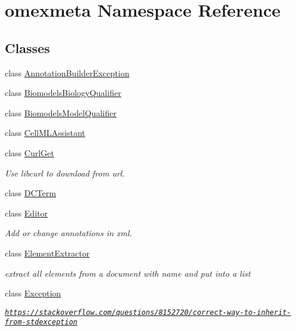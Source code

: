 \hypertarget{namespaceomexmeta}{}\section{omexmeta Namespace Reference}
\label{namespaceomexmeta}
\subsection*{Classes}
\begin{DoxyCompactItemize}
\item 
class \hyperlink{classomexmeta_1_1AnnotationBuilderException}{Annotation\+Builder\+Exception}
\item 
class \hyperlink{classomexmeta_1_1BiomodelsBiologyQualifier}{Biomodels\+Biology\+Qualifier}
\item 
class \hyperlink{classomexmeta_1_1BiomodelsModelQualifier}{Biomodels\+Model\+Qualifier}
\item 
class \hyperlink{classomexmeta_1_1CellMLAssistant}{Cell\+M\+L\+Assistant}
\item 
class \hyperlink{classomexmeta_1_1CurlGet}{Curl\+Get}
\begin{DoxyCompactList}\small\item\em Use libcurl to download from url. \end{DoxyCompactList}\item 
class \hyperlink{classomexmeta_1_1DCTerm}{D\+C\+Term}
\item 
class \hyperlink{classomexmeta_1_1Editor}{Editor}
\begin{DoxyCompactList}\small\item\em Add or change annotations in xml. \end{DoxyCompactList}\item 
class \hyperlink{classomexmeta_1_1ElementExtractor}{Element\+Extractor}
\begin{DoxyCompactList}\small\item\em extract all elements from a document with name and put into a list \end{DoxyCompactList}\item 
class \hyperlink{classomexmeta_1_1Exception}{Exception}
\begin{DoxyCompactList}\small\item\em \href{https://stackoverflow.com/questions/8152720/correct-way-to-inherit-from-stdexception}{\tt https\+://stackoverflow.\+com/questions/8152720/correct-\/way-\/to-\/inherit-\/from-\/stdexception} \end{DoxyCompactList}\item 

\end{DoxyCompactItemize}

